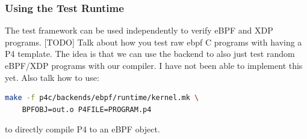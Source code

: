 \subsubsection{Using the Test Runtime}
The test framework can be used independently to verify eBPF and XDP programs. 
[TODO] Talk about how you test raw ebpf C programs with having a P4 template. 
The idea is that we can use the backend to also just test random eBPF/XDP 
programs with our compiler. I have not been able to implement this yet.
Also talk how to use:
\begin{lstlisting}[language=bash]
make -f p4c/backends/ebpf/runtime/kernel.mk \
	BPFOBJ=out.o P4FILE=PROGRAM.p4
\end{lstlisting}
to directly compile P4 to an eBPF object.
